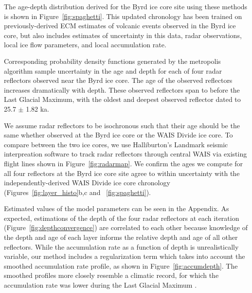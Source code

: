 
The age-depth distribution derived for the Byrd ice core site using these methods is shown in Figure~\ref{fig:spaghetti}. This updated chronology has been trained on previously-derived ECM estimates of volcanic events observed in the Byrd ice core, but also includes estimates of uncertainty in this data, radar observations, local ice flow parameters, and local accumulation rate. 

Corresponding probability density functions generated by the metropolis algorithm sample uncertainty in the age and depth for each of four radar reflectors observed near the Byrd ice core. The age of the observed reflectors increases dramatically with depth.  These observed reflectors span to before the Last Glacial Maximum, with the oldest and deepest observed reflector dated to 25.7 $\pm$ 1.82 ka. 

We assume radar reflectors to be isochronous such that their age should be the same whether observed at the Byrd ice core or the WAIS Divide ice core. To compare between the two ice cores, we use Halliburton's Landmark seismic interpreation software to track radar reflectors through central WAIS via existing flight lines shown in Figure~\ref{fig:radarmap}. We confirm the ages we compute for all four reflectors at the Byrd ice core site agree to within uncertainty with the independently-derived WAIS Divide ice core chronology (Figures~\ref{fig:layer_histo}b,c and ~\ref{fig:spaghetti}).

Estimated values of the model parameters can be seen in the Appendix. As expected, estimations of the depth of the four radar reflectors at each iteration (Figure~\ref{fig:depthconvergence}) are correlated to each other because knowledge of the depth and age of each layer informs the relative depth and age of all other reflectors. While the accumulation rate as a function of depth is unrealistically variable, our method includes a regularization term which takes into account the smoothed accumulation rate profile, as shown in Figure~\ref{fig:accumdepth}. The smoothed profiles more closely resemble a climatic record, for which the accumulation rate was lower during the Last Glacial Maximum%
. 

